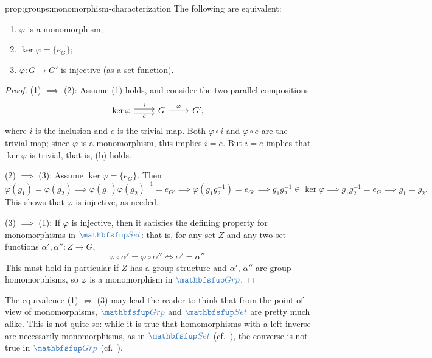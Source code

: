 \begin{prop}{}{prop:groups:monomorphism-characterization}
  The following are equivalent:
  \begin{enumerate}
  \item $\varphi$ is a monomorphism;
  \item $\ker\varphi = \{e_G\}$;
  \item $\varphi : G \to G'$ is injective (as a set-function).
  \end{enumerate}
\end{prop}
\begin{proof}
  (1) $\implies$ (2): Assume (1) holds, and consider the two parallel
  compositions
  \[
    \begin{tikzcd}
      \ker\varphi \arrow[r, shift left, "i"] \arrow[r, shift right,
      "e"'] & G \arrow[r, "\varphi"] & G',
    \end{tikzcd}
  \]
  where $i$ is the inclusion and $e$ is the trivial map. Both
  $\varphi \circ i$ and $\varphi \circ e$ are the trivial map; since
  $\varphi$ is a monomorphism, this implies $i = e$. But $i = e$
  implies that $\ker\varphi$ is trivial, that is, (b) holds.

  (2) $\implies$ (3): Assume $\ker\varphi = \{e_G\}$. Then
  \[
    \varphi(g_1) = \varphi(g_2) \implies \varphi(g_1)\varphi(g_2)^{-1}
    = e_{G'} \implies \varphi(g_1 g_2^{-1}) = e_{G'} \implies g_1
    g_2^{-1} \in \ker\varphi \implies g_1 g_2^{-1} = e_G \implies g_1
    = g_2.
  \]
  This shows that $\varphi$ is injective, as needed.

  (3) $\implies$ (1): If $\varphi$ is injective, then it satisfies the
  defining property for monomorphisms in $\categ{Set}$: that is, for
  any set $Z$ and any two set-functions $\alpha', \alpha'' : Z \to G$,
  \[
    \varphi \circ \alpha' = \varphi \circ \alpha'' \iff \alpha' =
    \alpha''.
  \]
  This must hold in particular if $Z$ has a group structure and
  $\alpha'$, $\alpha''$ are group homomorphisms, so $\varphi$ is a
  monomorphism in $\categ{Grp}$.
\end{proof}

The equivalence (1) $\iff$ (3) may lead the reader to think that from
the point of view of monomorphisms, $\categ{Grp}$ and $\categ{Set}$
are pretty much alike. This is not quite so: while it is true that
homomorphisms with a left-inverse are necessarily monomorphisms, as in
$\categ{Set}$ (cf.\
), the converse is
not true in $\categ{Grp}$ (cf.\
).

